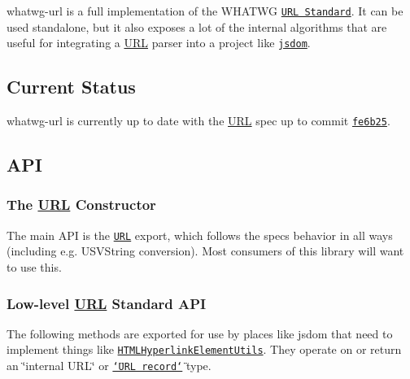 whatwg-\/url is a full implementation of the W\+H\+A\+T\+WG \href{https://url.spec.whatwg.org/}{\tt U\+RL Standard}. It can be used standalone, but it also exposes a lot of the internal algorithms that are useful for integrating a \mbox{\hyperlink{namespace_u_r_l}{U\+RL}} parser into a project like \href{https://github.com/tmpvar/jsdom}{\tt jsdom}.

\subsection*{Current Status}

whatwg-\/url is currently up to date with the \mbox{\hyperlink{namespace_u_r_l}{U\+RL}} spec up to commit \href{https://github.com/whatwg/url/commit/fe6b251739e225555f04319f19c70c031a5d99eb}{\tt fe6b25}.

\subsection*{A\+PI}

\subsubsection*{The {\ttfamily \mbox{\hyperlink{namespace_u_r_l}{U\+RL}}} Constructor}

The main A\+PI is the \href{https://url.spec.whatwg.org/#url}{\tt {\ttfamily U\+RL}} export, which follows the spec\textquotesingle{}s behavior in all ways (including e.\+g. {\ttfamily U\+S\+V\+String} conversion). Most consumers of this library will want to use this.

\subsubsection*{Low-\/level \mbox{\hyperlink{namespace_u_r_l}{U\+RL}} Standard A\+PI}

The following methods are exported for use by places like jsdom that need to implement things like \href{https://html.spec.whatwg.org/#htmlhyperlinkelementutils}{\tt {\ttfamily H\+T\+M\+L\+Hyperlink\+Element\+Utils}}. They operate on or return an \char`\"{}internal U\+R\+L\char`\"{} or \href{https://url.spec.whatwg.org/#concept-url}{\tt \char`\"{}\+U\+R\+L record\char`\"{}} type.


